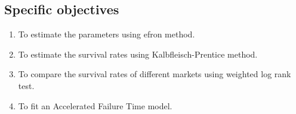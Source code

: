 \documentclass[twoside,a4paper,12pt]{article}
\begin{document}
\subsection*{Specific objectives}
\begin{enumerate}
	\item To estimate the parameters using efron method.
	\item To estimate the survival rates using Kalbfleisch-Prentice method.
	\item To compare the survival rates of different markets using weighted log rank test.
	
	
	\item To fit an Accelerated Failure Time model.
	
	
	

\end{enumerate}	

\begin{comment}
\section*{Literature Review}
In this literature review, we will discuss the impact of the COVID-19 pandemic on stock exchanges worldwide, the evaluation of changes in stock exchanges during the pandemic, and the use of accelerated failure time models (AFTMs) as an alternative to the Cox's regression model for time-to-event data.

\noindent The COVID-19 pandemic has had a significant impact on stock exchanges worldwide. Bieszk-Stolorz and Dmytrow (2021) evaluated the changes on world stock exchanges in connection with the SARS-CoV-2 pandemic. They found that the pandemic led to significant changes in stock exchanges, including increased volatility, reduced liquidity, and a shift towards risk-averse investment strategies.
\noindent The evaluation of changes in stock exchanges during the pandemic has been a focus of research. Ahmed Yahaya and Stephen Alaba John (2023) conducted a study on stock market liquidity and volatility on the Nigerian Exchange Limited. They found that the pandemic led to increased volatility and reduced liquidity in the Nigerian stock market.

\noindent Alternative models for analyzing time-to-event data have been proposed in recent years. C Silambarasan and Elangovan Elangovan (2023) suggested using the accelerated failure time model (AFTM) as an alternative to the Cox's regression model for analyzing time-to-event data. They argued that the AFTM provides a more flexible and interpretable framework for analyzing time-to-event data.

\noindent Tasneem Fatima Alam, M. Shafiqur Rahman, and Wasimul Bari (2022) conducted a study on the estimation for accelerated failure time models with small or rare event survival data. They found that the estimation of AFTMs with small or rare event survival data can be challenging due to the lack of sufficient data for estimating the model parameters. They proposed a new estimation method that addresses this issue.

\end{comment}
\end{document}
